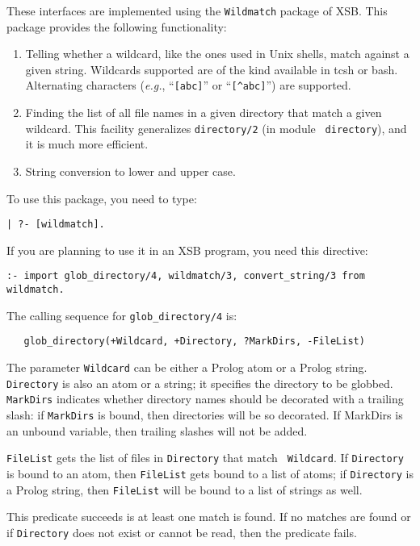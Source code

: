 These interfaces are implemented using the {\tt Wildmatch} package of XSB.
This package provides the following functionality: 
\begin{enumerate}
\item Telling whether a wildcard, like the ones used in Unix shells, match
  against a given string. Wildcards supported are of the kind available in
  tcsh or bash. Alternating characters ({\it e.g.}, ``\verb|[abc]|'' or
  ``\verb|[^abc]|'') are supported.
\item Finding the list of all file names in a given directory that match a
  given wildcard. This facility generalizes {\tt directory/2} (in module {\tt
    directory}), and it is much more efficient.
\item String conversion to lower and upper case.
\end{enumerate}

To use this package, you need to type:
\begin{verbatim}
| ?- [wildmatch].  
\end{verbatim}
If you are planning to use it in an XSB program, you need
this directive:
\begin{verbatim}
:- import glob_directory/4, wildmatch/3, convert_string/3 from wildmatch.
\end{verbatim}

The calling sequence for \verb|glob_directory/4| is:
\begin{verbatim}
   glob_directory(+Wildcard, +Directory, ?MarkDirs, -FileList)  
\end{verbatim}
The parameter {\tt Wildcard} can be either a Prolog atom or a Prolog
string. {\tt Directory} is also an atom or a string; it specifies the
directory to be globbed. {\tt MarkDirs} indicates whether directory names
should be decorated with a trailing slash: if {\tt MarkDirs} is bound, then
directories will be so decorated. If MarkDirs is an unbound variable, then
trailing slashes will not be added.

{\tt FileList} gets the list of files in {\tt Directory} that match {\tt
  Wildcard}.  If {\tt Directory} is bound to an atom, then {\tt FileList}
gets bound to a list of atoms; if {\tt Directory} is a Prolog string, then
{\tt FileList} will be bound to a list of strings as well.

This predicate succeeds is at least one match is found. If no matches are
found or if {\tt Directory} does not exist or cannot be read, then the
predicate fails.

